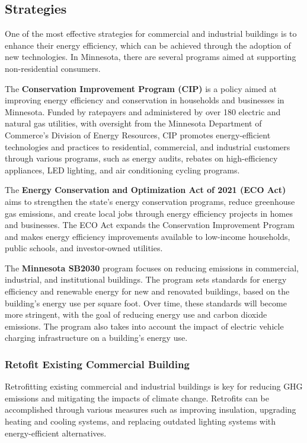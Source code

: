 \documentclass[
]{book}
\begin{document}
\hypertarget{strategies-1}{%
\subsection{Strategies}\label{strategies-1}}

One of the most effective strategies for commercial and industrial buildings is to enhance their energy efficiency, which can be achieved through the adoption of new technologies. In Minnesota, there are several programs aimed at supporting non-residential consumers.

The \textbf{Conservation Improvement Program (CIP)} is a policy aimed at improving energy efficiency and conservation in households and businesses in Minnesota. Funded by ratepayers and administered by over 180 electric and natural gas utilities, with oversight from the Minnesota Department of Commerce's Division of Energy Resources, CIP promotes energy-efficient technologies and practices to residential, commercial, and industrial customers through various programs, such as energy audits, rebates on high-efficiency appliances, LED lighting, and air conditioning cycling programs.

The \textbf{Energy Conservation and Optimization Act of 2021 (ECO Act)} aims to strengthen the state's energy conservation programs, reduce greenhouse gas emissions, and create local jobs through energy efficiency projects in homes and businesses. The ECO Act expands the Conservation Improvement Program and makes energy efficiency improvements available to low-income households, public schools, and investor-owned utilities.

The \textbf{Minnesota SB2030} program focuses on reducing emissions in commercial, industrial, and institutional buildings. The program sets standards for energy efficiency and renewable energy for new and renovated buildings, based on the building's energy use per square foot. Over time, these standards will become more stringent, with the goal of reducing energy use and carbon dioxide emissions. The program also takes into account the impact of electric vehicle charging infrastructure on a building's energy use.

\hypertarget{retofit-existing-commercial-building}{%
\subsubsection{Retofit Existing Commercial Building}\label{retofit-existing-commercial-building}}

Retrofitting existing commercial and industrial buildings is key for reducing GHG emissions and mitigating the impacts of climate change. Retrofits can be accomplished through various measures such as improving insulation, upgrading heating and cooling systems, and replacing outdated lighting systems with energy-efficient alternatives.
\end{document}
